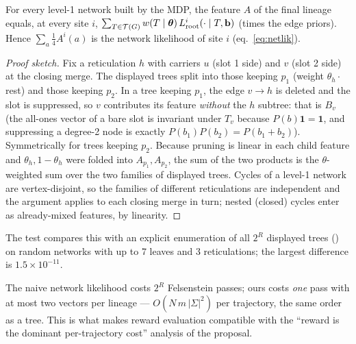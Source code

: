\begin{proposition}\label{prop:mix}
For every level-1 network built by the MDP, the feature $A$ of the final lineage equals, at every site $i$, $\sum_{T\in\mathcal T(G)}w(T\mid\bm{\theta})\,L^i_{\mathrm{root}}(\cdot\mid T,\mathbf{b})$ (times the edge priors). Hence $\sum_a\tfrac14A^i(a)$ is the network likelihood of site $i$ (eq.~\eqref{eq:netlik}).
\end{proposition}
\begin{proof}[Proof sketch]
Fix a reticulation $h$ with carriers $u$ (slot 1 side) and $v$ (slot 2 side) at the closing merge. The displayed trees split into those keeping $p_1$ (weight $\theta_h\cdot$rest) and those keeping $p_2$. In a tree keeping $p_1$, the edge $v\to h$ is deleted and the slot is suppressed, so $v$ contributes its feature \emph{without} the $h$ subtree: that is $B_v$ (the all-ones vector of a bare slot is invariant under $T_v$ because $P(b)\mathbf 1=\mathbf 1$, and suppressing a degree-2 node is exactly $P(b_1)P(b_2)=P(b_1+b_2)$). Symmetrically for trees keeping $p_2$. Because pruning is linear in each child feature and $\theta_h,1-\theta_h$ were folded into $A_{p_1},A_{p_2}$, the sum of the two products is the $\theta$-weighted sum over the two families of displayed trees. Cycles of a level-1 network are vertex-disjoint, so the families of different reticulations are independent and the argument applies to each closing merge in turn; nested (closed) cycles enter as already-mixed features, by linearity.
\end{proof}
The test  compares this with an explicit enumeration of all $2^R$ displayed trees () on random networks with up to 7 leaves and 3 reticulations; the largest difference is $1.5\times10^{-11}$.

\begin{whybox}
The naive network likelihood costs $2^R$ Felsenstein passes; ours costs \emph{one} pass with at most two vectors per lineage --- $O(N\,m\,|\Sigma|^2)$ per trajectory, the same order as a tree. This is what makes reward evaluation compatible with the ``reward is the dominant per-trajectory cost'' analysis of the proposal.
\end{whybox}


